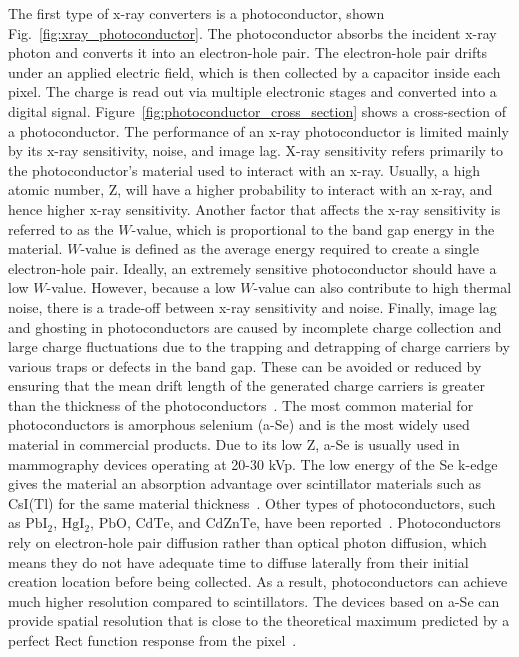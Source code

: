 The first type of x-ray converters is a photoconductor, shown Fig.~\ref{fig:xray_photoconductor}.  The photoconductor absorbs the incident x-ray photon and converts it into an electron-hole pair.  The electron-hole pair drifts under an applied electric field, which is then collected by a capacitor inside each pixel.  The charge is read out via multiple electronic stages and converted into a digital signal.  Figure~\ref{fig:photoconductor_cross_section} shows a cross-section of a photoconductor.  The performance of an x-ray photoconductor is limited mainly by its x-ray sensitivity, noise, and image lag.  X-ray sensitivity refers primarily to the photoconductor's material used to interact with an x-ray.  Usually, a high atomic number, Z, will have a higher probability to interact with an x-ray, and hence higher x-ray sensitivity.  Another factor that affects the x-ray sensitivity is referred to as the $W$-value, which is proportional to the band gap energy in the material.  $W$-value is defined as the average energy required to create a single electron-hole pair.  Ideally, an extremely sensitive photoconductor should have a low $W$-value.  However, because a low $W$-value can also contribute to high thermal noise, there is a trade-off between x-ray sensitivity and noise.  Finally, image lag and ghosting in photoconductors are caused by incomplete charge collection and large charge fluctuations due to the trapping and detrapping of charge carriers by various traps or defects in the band gap.  These can be avoided or reduced by ensuring that the mean drift length of the generated charge carriers is greater than the thickness of the photoconductors~\citep{Kim2008, kasap2006}.  The most common material for photoconductors is amorphous selenium (a-Se) and is the most widely used material in commercial products.  Due to its low Z, a-Se is usually used in mammography devices operating at 20-30 kVp.  The low energy of the Se k-edge gives the material an absorption advantage over scintillator materials such as CsI(Tl) for the same material thickness~\citep{Yorkston2007}.  Other types of photoconductors, such as $\mathrm{PbI_2}$, $\mathrm{HgI_2}$, $\mathrm{PbO}$, $\mathrm{CdTe}$, and $\mathrm{CdZnTe}$, have been reported~\citep{springer2007}.  Photoconductors rely on electron-hole pair diffusion rather than optical photon diffusion, which means they do not have adequate time to diffuse laterally from their initial creation location before being collected.  As a result, photoconductors can achieve much higher resolution compared to scintillators.  The devices based on a-Se can provide spatial resolution that is close to the theoretical maximum predicted by a perfect Rect function response from the pixel~\citep{hunt5030}. 

